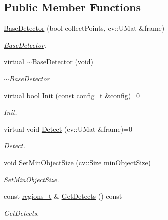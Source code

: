 \subsection*{Public Member Functions}
\begin{DoxyCompactItemize}
\item 
\mbox{\hyperlink{class_base_detector_a3c85e13a47dd472319dc43c60f0d102a}{Base\+Detector}} (bool collect\+Points, cv\+::\+U\+Mat \&frame)
\begin{DoxyCompactList}\small\item\em \mbox{\hyperlink{class_base_detector}{Base\+Detector}}. \end{DoxyCompactList}\item 
virtual \mbox{\hyperlink{class_base_detector_afc5cc0ccdbc1fc1b60371f22bed620fd}{$\sim$\+Base\+Detector}} (void)
\begin{DoxyCompactList}\small\item\em $\sim$\+Base\+Detector \end{DoxyCompactList}\item 
virtual bool \mbox{\hyperlink{class_base_detector_a44c53608e9e4e3455ff553d987165260}{Init}} (const \mbox{\hyperlink{defines_8h_a81d657237a541d02f8eeefdd40191920}{config\+\_\+t}} \&config)=0
\begin{DoxyCompactList}\small\item\em Init. \end{DoxyCompactList}\item 
virtual void \mbox{\hyperlink{class_base_detector_a9c9dedfffb7673fd2995f24bdb9ade18}{Detect}} (cv\+::\+U\+Mat \&frame)=0
\begin{DoxyCompactList}\small\item\em Detect. \end{DoxyCompactList}\item 
void \mbox{\hyperlink{class_base_detector_ab459f4e77cf1110cc1ee84027f0f2a03}{Set\+Min\+Object\+Size}} (cv\+::\+Size min\+Object\+Size)
\begin{DoxyCompactList}\small\item\em Set\+Min\+Object\+Size. \end{DoxyCompactList}\item 
const \mbox{\hyperlink{defines_8h_a01db0de56a20f4342820a093c5154536}{regions\+\_\+t}} \& \mbox{\hyperlink{class_base_detector_a52ac4b2feed15a47de84a69eb45c233f}{Get\+Detects}} () const
\begin{DoxyCompactList}\small\item\em Get\+Detects. \end{DoxyCompactList}\item 

\end{DoxyCompactItemize}
